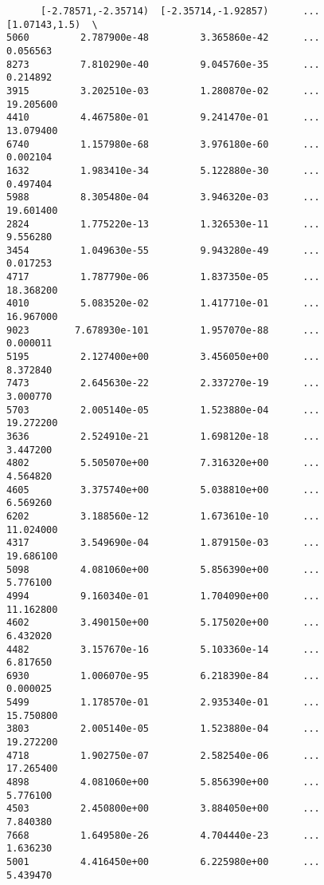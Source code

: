 \documentclass[11pt]{article}
\begin{document}
\begin{verbatim}
      [-2.78571,-2.35714)  [-2.35714,-1.92857)      ...        [1.07143,1.5)  \
5060         2.787900e-48         3.365860e-42      ...             0.056563   
8273         7.810290e-40         9.045760e-35      ...             0.214892   
3915         3.202510e-03         1.280870e-02      ...            19.205600   
4410         4.467580e-01         9.241470e-01      ...            13.079400   
6740         1.157980e-68         3.976180e-60      ...             0.002104   
1632         1.983410e-34         5.122880e-30      ...             0.497404   
5988         8.305480e-04         3.946320e-03      ...            19.601400   
2824         1.775220e-13         1.326530e-11      ...             9.556280   
3454         1.049630e-55         9.943280e-49      ...             0.017253   
4717         1.787790e-06         1.837350e-05      ...            18.368200   
4010         5.083520e-02         1.417710e-01      ...            16.967000   
9023        7.678930e-101         1.957070e-88      ...             0.000011   
5195         2.127400e+00         3.456050e+00      ...             8.372840   
7473         2.645630e-22         2.337270e-19      ...             3.000770   
5703         2.005140e-05         1.523880e-04      ...            19.272200   
3636         2.524910e-21         1.698120e-18      ...             3.447200   
4802         5.505070e+00         7.316320e+00      ...             4.564820   
4605         3.375740e+00         5.038810e+00      ...             6.569260   
6202         3.188560e-12         1.673610e-10      ...            11.024000   
4317         3.549690e-04         1.879150e-03      ...            19.686100   
5098         4.081060e+00         5.856390e+00      ...             5.776100   
4994         9.160340e-01         1.704090e+00      ...            11.162800   
4602         3.490150e+00         5.175020e+00      ...             6.432020   
4482         3.157670e-16         5.103360e-14      ...             6.817650   
6930         1.006070e-95         6.218390e-84      ...             0.000025   
5499         1.178570e-01         2.935340e-01      ...            15.750800   
3803         2.005140e-05         1.523880e-04      ...            19.272200   
4718         1.902750e-07         2.582540e-06      ...            17.265400   
4898         4.081060e+00         5.856390e+00      ...             5.776100   
4503         2.450800e+00         3.884050e+00      ...             7.840380   
7668         1.649580e-26         4.704440e-23      ...             1.636230   
5001         4.416450e+00         6.225980e+00      ...             5.439470   

\end{verbatim}
\end{document}
